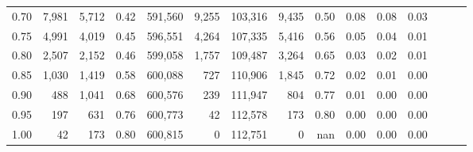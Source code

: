 \begin{tabular}{rrrrrrrrrrrrrrr}
0.70 &    7,981 &   5,712 &  0.42 &  591,560 &    9,255 &  103,316 &    9,435 &  0.50 &  0.08 &  0.08 &      0.03 \\
0.75 &    4,991 &   4,019 &  0.45 &  596,551 &    4,264 &  107,335 &    5,416 &  0.56 &  0.05 &  0.04 &      0.01 \\
0.80 &    2,507 &   2,152 &  0.46 &  599,058 &    1,757 &  109,487 &    3,264 &  0.65 &  0.03 &  0.02 &      0.01 \\
0.85 &    1,030 &   1,419 &  0.58 &  600,088 &      727 &  110,906 &    1,845 &  0.72 &  0.02 &  0.01 &      0.00 \\
0.90 &      488 &   1,041 &  0.68 &  600,576 &      239 &  111,947 &      804 &  0.77 &  0.01 &  0.00 &      0.00 \\
0.95 &      197 &     631 &  0.76 &  600,773 &       42 &  112,578 &      173 &  0.80 &  0.00 &  0.00 &      0.00 \\
1.00 &       42 &     173 &  0.80 &  600,815 &        0 &  112,751 &        0 &   nan &  0.00 &  0.00 &      0.00 \\
\bottomrule
\end{tabular}
